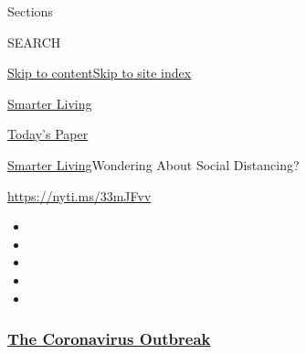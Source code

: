 Sections

SEARCH

\protect\hyperlink{site-content}{Skip to
content}\protect\hyperlink{site-index}{Skip to site index}

\href{https://www.nytimes3xbfgragh.onion/section/smarter-living}{Smarter
Living}

\href{https://myaccount.nytimes3xbfgragh.onion/auth/login?response_type=cookie\&client_id=vi}{}

\href{https://www.nytimes3xbfgragh.onion/section/todayspaper}{Today's
Paper}

\href{/section/smarter-living}{Smarter Living}\textbar{}Wondering About
Social Distancing?

\url{https://nyti.ms/33mJFvv}

\begin{itemize}
\item
\item
\item
\item
\item
\end{itemize}

\hypertarget{the-coronavirus-outbreak}{%
\subsubsection{\texorpdfstring{\href{https://www.nytimes3xbfgragh.onion/news-event/coronavirus?name=styln-coronavirus-national\&region=TOP_BANNER\&block=storyline_menu_recirc\&action=click\&pgtype=Article\&impression_id=912db9f0-efba-11ea-9307-2f39405dea1d\&variant=undefined}{The
Coronavirus
Outbreak}}{The Coronavirus Outbreak}}\label{the-coronavirus-outbreak}}

